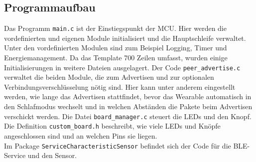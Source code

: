 \subsection{Programmaufbau}
Das Programm \texttt{main.c} ist der Einstiegspunkt der MCU.
Hier werden die vordefinierten und eigenen Module initialisiert und die Hauptschleife verwaltet.
Unter den vordefinierten Modulen sind zum Beispiel Logging, Timer und Energiemanagement.
Da das Template 700 Zeilen umfasst, wurden einige Initialisierungen in weitere Dateien ausgelagert.
Der Code \texttt{peer\_advertise.c} verwaltet die beiden Module, die zum Advertisen und zur optionalen Verbindungsverschlüsselung nötig sind.
Hier kann unter anderem eingestellt werden, wie lange das Advertisen stattfindet, bevor das Wearable automatisch in den Schlafmodus wechselt und in welchen Abständen die Pakete beim Advertisen verschickt werden.
Die Datei \texttt{board\_manager.c} steuert die LEDs und den Knopf.
Die Definition \texttt{custom\_board.h} beschreibt, wie viele LEDs und Knöpfe angeschlossen sind und an welchen Pins sie liegen.\\
Im Package \texttt{ServiceCharacteristicSensor} befindet sich der Code für die BLE-Service und den Sensor.

